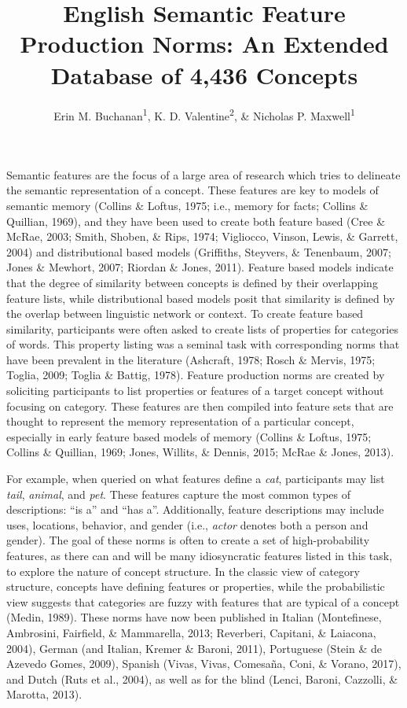 \documentclass[english,,man]{apa6}
\title{English Semantic Feature Production Norms: An Extended Database of 4,436
Concepts}
\author{Erin M. Buchanan\textsuperscript{1}, K. D. Valentine\textsuperscript{2},
\& Nicholas P. Maxwell\textsuperscript{1}}
\date{}
\affiliation{
\vspace{0.5cm}
\textsuperscript{1} Missouri State University\\\textsuperscript{2} University of Missouri}
\theoremstyle{definition}
\theoremstyle{definition}
\theoremstyle{definition}
\theoremstyle{remark}
\begin{document}
\maketitle

Semantic features are the focus of a large area of research which tries
to delineate the semantic representation of a concept. These features
are key to models of semantic memory (Collins \& Loftus, 1975; i.e.,
memory for facts; Collins \& Quillian, 1969), and they have been used to
create both feature based (Cree \& McRae, 2003; Smith, Shoben, \& Rips,
1974; Vigliocco, Vinson, Lewis, \& Garrett, 2004) and distributional
based models (Griffiths, Steyvers, \& Tenenbaum, 2007; Jones \& Mewhort,
2007; Riordan \& Jones, 2011). Feature based models indicate that the
degree of similarity between concepts is defined by their overlapping
feature lists, while distributional based models posit that similarity
is defined by the overlap between linguistic network or context. To
create feature based similarity, participants were often asked to create
lists of properties for categories of words. This property listing was a
seminal task with corresponding norms that have been prevalent in the
literature (Ashcraft, 1978; Rosch \& Mervis, 1975; Toglia, 2009; Toglia
\& Battig, 1978). Feature production norms are created by soliciting
participants to list properties or features of a target concept without
focusing on category. These features are then compiled into feature sets
that are thought to represent the memory representation of a particular
concept, especially in early feature based models of memory (Collins \&
Loftus, 1975; Collins \& Quillian, 1969; Jones, Willits, \& Dennis,
2015; McRae \& Jones, 2013).

For example, when queried on what features define a \emph{cat},
participants may list \emph{tail}, \emph{animal}, and \emph{pet}. These
features capture the most common types of descriptions: \enquote{is a}
and \enquote{has a}. Additionally, feature descriptions may include
uses, locations, behavior, and gender (i.e., \emph{actor} denotes both a
person and gender). The goal of these norms is often to create a set of
high-probability features, as there can and will be many idiosyncratic
features listed in this task, to explore the nature of concept
structure. In the classic view of category structure, concepts have
defining features or properties, while the probabilistic view suggests
that categories are fuzzy with features that are typical of a concept
(Medin, 1989). These norms have now been published in Italian
(Montefinese, Ambrosini, Fairfield, \& Mammarella, 2013; Reverberi,
Capitani, \& Laiacona, 2004), German (and Italian, Kremer \& Baroni,
2011), Portuguese (Stein \& de Azevedo Gomes, 2009), Spanish (Vivas,
Vivas, Comesaña, Coni, \& Vorano, 2017), and Dutch (Ruts et al., 2004),
as well as for the blind (Lenci, Baroni, Cazzolli, \& Marotta, 2013).
\end{document}

